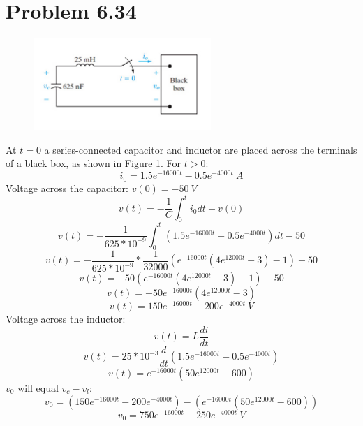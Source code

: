 \documentclass[12pt]{article}
\begin{document}
    \section*{Problem 6.34}
    \begin{figure}[h]
        \centering
        \includegraphics[width=0.6\textwidth]{Figure 1.png}
    \end{figure}
    At $t=0$ a series-connected capacitor and inductor are placed across the
    terminals of a black box, as shown in Figure 1. For $t>0$:
    \[
        i_0 = 1.5e^{-16000t} - 0.5e^{-4000t}\ A
    \]
    \noindent Voltage across the capacitor: $v(0) = -50\ V$
    \[
        v(t) = -\frac{1}{C} \int_0^t i_0 dt + v(0)
    \]
    \[
        v(t) = -\frac{1}{625*10^{-9}} \int_0^t (1.5e^{-16000t} - 0.5e^{-4000t}) dt -
        50
    \]
    \[
        v(t) = -\frac{1}{625*10^{-9}} * \frac{1}{32000}
        (e^{-16000t}(4e^{12000t}-3)-1) - 50
    \]
    \[
        v(t) = -50(e^{-16000t}(4e^{12000t} - 3) -1) - 50
    \]
    \[
        v(t) = -50e^{-16000t}(4e^{12000t} - 3)
    \]
    \[
        v(t) = 150e^{-16000t} - 200e^{-4000t}\ V
    \]
    Voltage across the inductor:
    \[
        v(t) = L \frac{di}{dt}
    \]
    \[
        v(t) = 25*10^{-3} \frac{d}{dt}(1.5e^{-16000t} - 0.5e^{-4000t})
    \]
    \[
        v(t) = e^{-16000t}(50e^{12000t} - 600)
    \]
    $v_0$ will equal $v_c - v_l$:
    \[
        v_0 = (150e^{-16000t} - 200e^{-4000t}) - (e^{-16000t}(50e^{12000t} - 600))
    \]
    \[
        \boxed{v_0 = 750e^{-16000t} - 250e^{-4000t}\ V}
    \]
\end{document}
